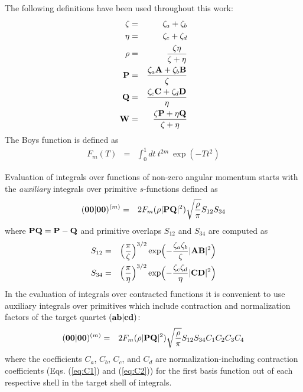 \documentclass[10pt]{article}
\begin{document}
The following definitions have been used throughout this work:
\begin{eqnarray}
\zeta & = & \zeta_a + \zeta_b \\
\eta  & = & \zeta_c + \zeta_d \\
\rho  & = & \frac{\zeta\eta}{\zeta+\eta} \\
{\bf P}& = & \frac{\zeta_a {\bf A} + \zeta_b {\bf B}}{\zeta} \\
{\bf Q}& = & \frac{\zeta_c {\bf C} + \zeta_d {\bf D}}{\eta} \\
{\bf W}& = & \frac{\zeta {\bf P} + \eta {\bf Q}}{\zeta+\eta}
\end{eqnarray}
The Boys function is defined as
\begin{eqnarray}
F_m(T) & = & \int_0^{1} dt\ t^{2m}\ \exp (-Tt^2)
\end{eqnarray}

Evaluation of integrals over functions of non-zero angular momentum starts with the
{\em auxiliary} integrals over primitive $s$-functions
defined as
\begin{eqnarray}
\label{eq:0000m}
({\bf 00}|{\bf 00})^{(m)} & = & 2 F_m(\rho |{\bf PQ}|^2) \sqrt{\frac{\rho}{\pi}}S_{12}S_{34}
\end{eqnarray}
where ${\bf PQ} = {\bf P} - {\bf Q}$ and primitive overlaps $S_{12}$ and $S_{34}$
are computed as
\begin{eqnarray} \label{eq:S12}
S_{12} & = & \Bigl( \frac{\pi}{\zeta} \Bigr)^{3/2}
\exp \Bigl(-\frac{\zeta_a\zeta_b}{\zeta} |{\bf AB}|^2 \Bigr) \\
\label{eq:S34}
S_{34} & = & \Bigl( \frac{\pi}{\eta} \Bigr)^{3/2}
\exp \Bigl(-\frac{\zeta_c\zeta_d}{\eta} |{\bf CD}|^2 \Bigr)
\end{eqnarray}
In the evaluation of integrals over contracted functions it is convenient to
use auxiliary integrals over primitives which include contraction and normalization factors of the
target quartet $({\bf ab}|{\bf cd})$:
\begin{eqnarray} \label{eq:0000m_scaled}
({\bf 00}|{\bf 00})^{(m)} & = &  2 F_m(\rho |{\bf PQ}|^2) \sqrt{\frac{\rho}{\pi}}S_{12}S_{34}
C_1 C_2 C_3 C_4
\end{eqnarray}
where the coefficients $C_a$, $C_b$, $C_c$, and $C_d$ are
normalization-including contraction coefficients (Eqs. (\ref{eq:C1})
and (\ref{eq:C2})) for the first basis function out of each respective shell
in the target shell of integrals.



\end{document}
